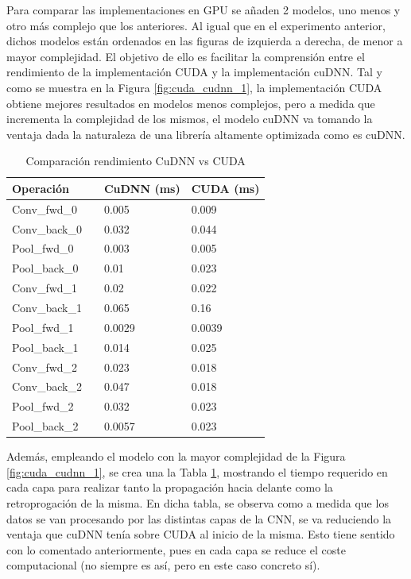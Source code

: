 Para comparar las implementaciones en GPU se añaden 2 modelos, uno menos y otro más complejo que los anteriores. Al igual que en el experimento anterior, dichos modelos están ordenados en las figuras de izquierda a derecha, de menor a mayor complejidad. El objetivo de ello es facilitar la comprensión entre el rendimiento de la implementación CUDA y la implementación cuDNN. Tal y como se muestra en la Figura \ref{fig:cuda_cudnn_1}, la implementación CUDA obtiene mejores resultados en modelos menos complejos, pero a medida que incrementa la complejidad de los mismos, el modelo cuDNN va tomando la ventaja dada la naturaleza de una librería altamente optimizada como es cuDNN.

\begin{table}[H]
	\centering
	\begin{tabular}{llll}
		Operación 	 &\vline  & CuDNN (ms) & CUDA (ms)  \\
		\hline
		
		Conv\_fwd\_0    & \vline & 0.005	 &	0.009 \\			
		Conv\_back\_0   & \vline & 	0.032 &	0.044 \\
		\hline
		Pool\_fwd\_0 	 & \vline & 0.003	 &	0.005 \\
		Pool\_back\_0 	 & \vline & 0.01    &	0.023 \\
		\hline
		\hline
		\hline
		Conv\_fwd\_1    & \vline & 0.02	 &	0.022	\\			
		Conv\_back\_1   & \vline & 0.065	 &	0.16	\\
		\hline
		Pool\_fwd\_1 	 & \vline & 0.0029	 &	0.0039	 \\
		Pool\_back\_1 	 & \vline  & 0.014    &	0.025	 \\
		\hline
		\hline
		\hline
		Conv\_fwd\_2    & \vline & 0.023	 &	0.018 \\			
		Conv\_back\_2   & \vline & 0.047	 &	0.018 \\
		\hline
		Pool\_fwd\_2 	 & \vline & 0.032	 &	0.023 \\
		Pool\_back\_2 	 & \vline & 0.0057    &	0.023 \\	
	\end{tabular}
	\caption{Comparación rendimiento CuDNN vs CUDA}
	\label{tabla_resultados}
\end{table}

Además, empleando el modelo con la mayor complejidad de la Figura \ref{fig:cuda_cudnn_1}, se crea una la Tabla \ref{tabla_resultados}, mostrando el tiempo requerido en cada capa para realizar tanto la propagación hacia delante como la retroprogación de la misma.
En dicha tabla, se observa como a medida que los datos se van procesando por las distintas capas de la CNN, se va reduciendo la ventaja que cuDNN tenía sobre CUDA al inicio de la misma. Esto tiene sentido con lo comentado anteriormente, pues en cada capa se reduce el coste computacional (no siempre es así, pero en este caso concreto sí).